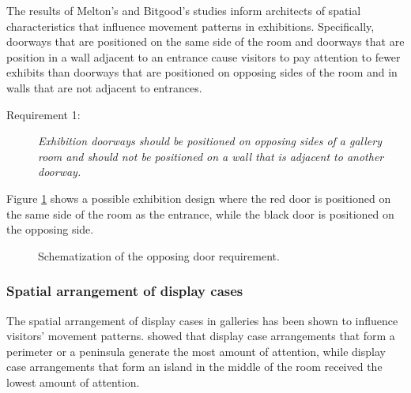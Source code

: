 \documentclass[12pt]{ucthesis}
\begin{document}
The results of Melton's and Bitgood's studies inform architects of spatial characteristics that influence movement patterns in exhibitions. Specifically, doorways that are positioned on the same side of the room and doorways that are position in a wall adjacent to an entrance cause visitors to pay attention to fewer exhibits than doorways that are positioned on opposing sides of the room and in walls that are not adjacent to entrances.

\begin{description}
\item[Requirement 1:] \emph{Exhibition doorways should be positioned on opposing sides of a gallery room and should not be positioned on a wall that is adjacent to another doorway.} 
\end{description}

Figure \ref{door-position} shows a possible exhibition design where the red door is positioned on the same side of the room as the entrance, while the black door is positioned on the opposing side.
\begin{figure}[H]
\centering
{}
\caption{Schematization of the opposing door requirement.}
\label{door-position}
\end{figure} 


\subsubsection{Spatial arrangement of display cases}
The spatial arrangement of display cases in galleries has been shown to influence visitors' movement patterns. \cite{Bitgood92} showed that display case arrangements that form a perimeter or a peninsula generate the most amount of attention, while display case arrangements that form an island in the middle of the room received the lowest amount of attention.
\end{document}

